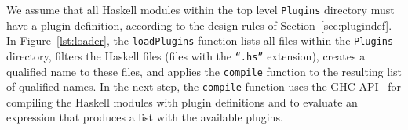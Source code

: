 
We assume that
all Haskell modules within the top level \texttt{Plugins} directory must have a plugin
definition, according to the design rules of Section~\ref{sec:plugindef}.  
In Figure~\ref{lst:loader}, the \texttt{loadPlugins} function lists all files within the
\texttt{Plugins} directory, filters the Haskell files (files
 with the \texttt{``.hs''} extension), creates a qualified name to these
 files, and applies the \texttt{compile} function to the resulting
 list of qualified names. In the next step, the \texttt{compile}
 function uses the GHC API~\cite{ghc-api}
 for compiling the Haskell modules with plugin definitions and to
 evaluate an expression that produces a list with the available
 plugins. 

